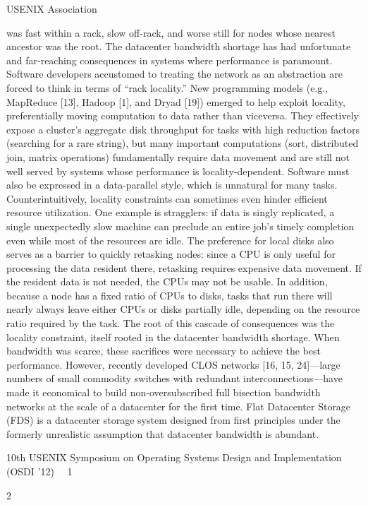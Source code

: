 USENIX Association  

was fast within a rack, slow off-rack, and worse still for
nodes whose nearest ancestor was the root.
The datacenter bandwidth shortage has had unfortunate and far-reaching consequences in systems where
performance is paramount. Software developers accustomed to treating the network as an abstraction are
forced to think in terms of “rack locality.” New programming models (e.g., MapReduce [13], Hadoop [1],
and Dryad [19]) emerged to help exploit locality, preferentially moving computation to data rather than viceversa. They effectively expose a cluster’s aggregate disk
throughput for tasks with high reduction factors (searching for a rare string), but many important computations
(sort, distributed join, matrix operations) fundamentally
require data movement and are still not well served by
systems whose performance is locality-dependent. Software must also be expressed in a data-parallel style,
which is unnatural for many tasks.
Counterintuitively, locality constraints can sometimes
even hinder efficient resource utilization. One example is
stragglers: if data is singly replicated, a single unexpectedly slow machine can preclude an entire job’s timely
completion even while most of the resources are idle.
The preference for local disks also serves as a barrier
to quickly retasking nodes: since a CPU is only useful for processing the data resident there, retasking requires expensive data movement. If the resident data is
not needed, the CPUs may not be usable. In addition, because a node has a fixed ratio of CPUs to disks, tasks that
run there will nearly always leave either CPUs or disks
partially idle, depending on the resource ratio required
by the task.
The root of this cascade of consequences was the locality constraint, itself rooted in the datacenter bandwidth shortage. When bandwidth was scarce, these sacrifices were necessary to achieve the best performance.
However, recently developed CLOS networks [16, 15,
24]—large numbers of small commodity switches with
redundant interconnections—have made it economical to
build non-oversubscribed full bisection bandwidth networks at the scale of a datacenter for the first time. Flat
Datacenter Storage (FDS) is a datacenter storage system
designed from first principles under the formerly unrealistic assumption that datacenter bandwidth is abundant.

10th USENIX Symposium on Operating Systems Design and Implementation (OSDI ’12)  1


2

